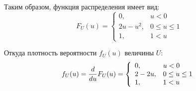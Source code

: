 \begin{enumerate}
    Таким образом, функция распределения имеет вид:
    \begin{equation}
        F_U(u)
        = \left \{
        \begin{array}{ll}
            0,         & u < 0         \\
            2 u - u^2, & 0 \le u \le 1 \\
            1,         & 1 < u
        \end{array}
        \right .
    \end{equation}

    Откуда плотность вероятности $f_U(u)$ величины $U$:
    \begin{equation}
        f_U(u)
        = \frac{d}{du} F_U(u)
        = \left \{
        \begin{array}{ll}
            0,      & u < 0         \\
            2 - 2u, & 0 \le u \le 1 \\
            1,      & 1 < u
        \end{array}
        \right .
    \end{equation}

%
\end{enumerate}

